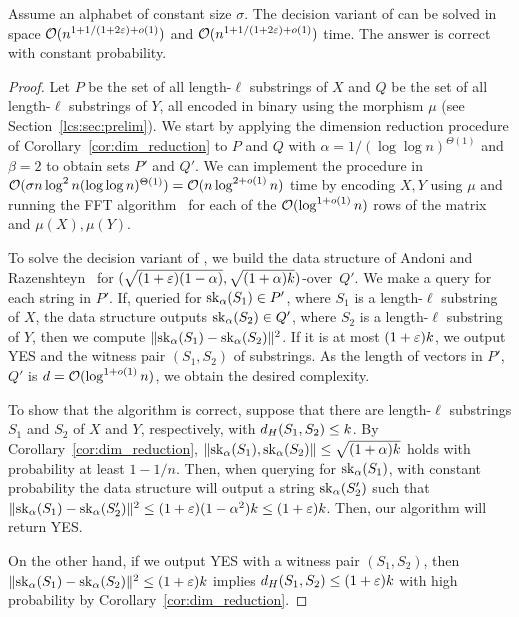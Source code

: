 \begin{lemma}\label{lm:opt_NN}
Assume an alphabet of constant size $\sigma$. The decision variant of \kApproxLCS can be solved in space $\mathcal{O}(n^{1+ 1/(1+2\varepsilon) + o(1)})$ and $\mathcal{O}(n^{1+ 1/(1+2\varepsilon) + o(1)})$ time. The answer is correct with constant probability. 
\end{lemma}
\begin{proof}
Let $P$ be the set of all length-$\ell$ substrings of $X$ and $Q$ be the set of all length-$\ell$ substrings of $Y$,
all encoded in binary using the morphism $\mu$ (see Section~\ref{lcs:sec:prelim}). We start by applying the dimension reduction procedure of Corollary~\ref{cor:dim_reduction} to $P$ and $Q$ with $\alpha = 1/(\log\log n)^{\Theta(1)}$ and $\beta = 2$ to obtain sets $P'$ and $Q'$. We can implement the procedure in $\mathcal{O}(\sigma n \log^2 n (\log\log n)^{\Theta(1)}) = \mathcal{O}(n \log^{2+o(1)} n)$ time by encoding $X, Y$ using $\mu$ and running the FFT algorithm~\cite{FischerPaterson} for each of the $\mathcal{O}(\log^{1+o(1)} n)$ rows of the matrix and $\mu(X), \mu(Y)$. 

To solve the decision variant of \kApproxLCS, we build the data structure of Andoni and Razenshteyn~\cite{DBLP:conf/stoc/AndoniR15} for $(\sqrt{(1+\varepsilon)(1-\alpha)}, \sqrt{(1+\alpha)k})$-\NN over~$Q'$. We make a query for each string in $P'$. If, queried for $\mathrm{sk}_{\alpha}(S_1)\in P'$, where $S_1$ is a length-$\ell$ substring of $X$, the data structure outputs $\mathrm{sk}_{\alpha}(S_2)\in Q'$, where $S_2$ is a length-$\ell$ substring of $Y$, then we compute $\lVert\mathrm{sk}_{\alpha}(S_1)- \mathrm{sk}_{\alpha}(S_2)\rVert^2$. If it is at most $(1+\varepsilon)k$, we output YES and the witness pair $(S_1,S_2)$ of substrings. As the length of vectors in $P'$, $Q'$ is $d = \mathcal{O}(\log^{1+o(1)} n)$, we obtain the desired complexity. 

To show that the algorithm is correct, suppose that there are length-$\ell$ substrings $S_1$ and $S_2$ of $X$ and $Y$, respectively, with $d_H(S_1, S_2) \le k$. By Corollary~\ref{cor:dim_reduction}, $\lVert\mathrm{sk}_\alpha(S_1),\mathrm{sk}_\alpha(S_2)\rVert\le \sqrt{(1+\alpha)k}$ holds with probability at least $1-1/n$. Then, when querying for $\mathrm{sk}_\alpha(S_1)$, with constant probability the data structure will output a string $\mathrm{sk}_\alpha(S'_2)$ such that $\lVert\mathrm{sk}_\alpha(S_1) - \mathrm{sk}_\alpha(S'_2)\rVert^2 \le (1+\varepsilon)(1-\alpha^2) k \le (1+\varepsilon) k$. Then, our algorithm will return YES. 

On the other hand, if we output YES with a witness pair $(S_1,S_2)$, then $\lVert\mathrm{sk}_\alpha(S_1) - \mathrm{sk}_\alpha(S_2)\rVert^2\le (1+\varepsilon)k$ implies $d_H(S_1,S_2)\le (1+\varepsilon)k$ with high probability by Corollary~\ref{cor:dim_reduction}.
\end{proof}

